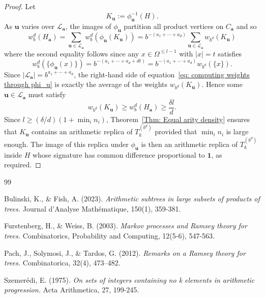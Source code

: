 \documentclass[11pt]{amsart}
\newcommand\labs[1]{\left\lvert#1\right\rvert}
\renewcommand{\leq}{\leqslant}
\renewcommand{\geq}{\geqslant}
\theoremstyle{plain}
\theoremstyle{definition}
\theoremstyle{remark}
\begin{document}
\begin{proof}
Let
\[ K_{\mathbf{u}}:= \phi_{\mathbf{u}}^{-1}(H). \]
As $\mathbf{u}$ varies over $\mathcal{L}_{\mathbf{a}}$, the images of $\phi_{\mathbf{u}}$ partition all product vertices on $C_{\mathbf{a}}$ and so
\begin{equation}\label{eq: computing weights through phi_u}
w_b^d(H_{\mathbf{a}}) = \sum_{\mathbf{u}\in \mathcal{L}_{\mathbf{a}}} w_b^d(\phi_{\mathbf{u}}(K_{\mathbf{u}})) = b^{-(a_1 + \cdots + a_d)} \sum_{\mathbf{u} \in \mathcal{L}_{\mathbf{a}}} w_{b^d}(K_{\mathbf{u}})
\end{equation}
where the second equality follows since any $x \in \Omega^{\leq l-1}$ with $\labs{x} = t$ satisfies
\[ w_b^d(\{\phi_{\mathbf{u}}(x)\}) = b^{-\left(a_1+\cdots+a_d + dt\right)} = b^{-(a_1+\cdots+a_d)} w_{b^d}(\{x\}).\]
Since $\labs{\mathcal{L}_{\mathbf{a}}}=b^{a_1+\cdots+a_d}$, the right-hand side of equation~\eqref{eq: computing weights through phi_u} is exactly the average of the weights $w_{b^d}(K_{\mathbf{u}})$. Hence some $\mathbf{u}\in \mathcal{L}_{\mathbf{a}}$ must satisfy
\[ w_{b^d}(K_{\mathbf{u}}) \geq w_b^d(H_{\mathbf{a}}) \geq \frac{\delta l}{d}.\]
Since $l \geq (\delta/d)(1+\min_i n_i)$, Theorem~\ref{Thm: Equal arity density} ensures that $K_{\mathbf{u}}$ contains an arithmetic replica of $T_k^{\left(b^d\right)}$ provided that $\min_i n_i$ is large enough. The image of this replica under $\phi_{\mathbf{u}}$ is then an arithmetic replica of $T_k^{\left(b^d\right)}$ inside $H$ whose signature has common difference proportional to $\mathbf{1}$, as required.
\end{proof}
\begin{thebibliography}{99}


 Bulinski, K., \& Fish, A. (2023). \emph{Arithmetic subtrees in large subsets of products of trees.} Journal d'Analyse Mathématique, 150(1), 359-381.

 Furstenberg, H., \& Weiss, B. (2003). \emph{Markov processes and Ramsey theory for trees.} Combinatorics, Probability and Computing, 12(5-6), 547-563.

Pach, J., Solymosi, J., \& Tardos, G. (2012).
\emph{Remarks on a Ramsey theory for trees.}
Combinatorica, 32(4), 473--482.

 Szemer\'{e}di, E. (1975). \emph{On sets of integers containing no k elements in arithmetic progression.} Acta Arithmetica, 27, 199-245.




\end{thebibliography}
\end{document}
